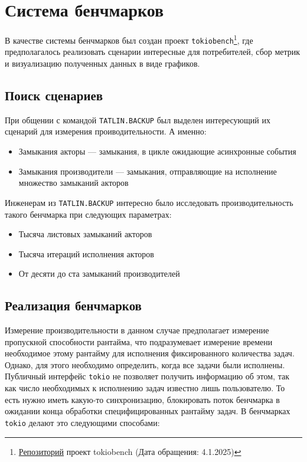 
\section{Система бенчмарков}

В качестве системы бенчмарков был создан проект \verb|tokiobench|\footnote{\href{https://github.com/IgorErin/tokiobench}{Репозиторий} проект tokiobench (Дата обращения: 4.1.2025)}, где предполагалось реализовать сценарии интересные для потребителей, сбор метрик и визуализацию полученных данных в виде графиков.

\subsection{Поиск сценариев}

При общении с командой \verb|TATLIN.BACKUP| был выделен интересующий их сценарий для измерения проиводительности. А именно:

\begin{itemize}
    \item Замыкания акторы --- замыкания, в цикле ожидающие асинхронные события
    \item Замыкания производители --- замыкания, отправляющие на исполнение множество замыканий акторов
\end{itemize}

Инженерам из \verb|TATLIN.BACKUP| интересно было исследовать производительность такого бенчмарка при следующих параметрах:

\begin{itemize}
    \item Тысяча листовых замыканий акторов
    \item Тысяча итераций исполнения акторов
    \item От десяти до ста замыканий производителей
\end{itemize}

\subsection{Реализация бенчмарков}

Измерение производительности в данном случае предполагает измерение пропускной способности рантайма, что подразумевает измерение времени необходимое этому рантайму для исполнения фиксированного количества задач. Однако, для этого необходимо определить, когда все задачи были исполнены. Публичный интерфейс \verb|tokio| не позволяет получить информацию об этом, так как число необходимых к исполнению задач известно лишь пользователю. То есть нужно иметь какую-то синхронизацию, блокировать поток бенчмарка в ожидании конца обработки специфицированных рантайму задач. В бенчмарках \verb|tokio| делают это следующими способами:

